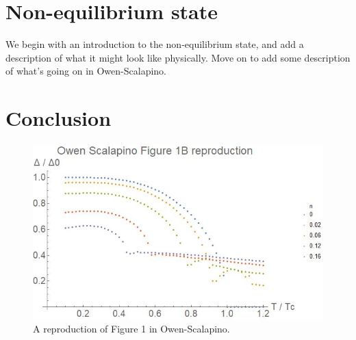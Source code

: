 \documentclass[%
 preprint,
 amsmath,amssymb,
 aps,
]{revtex4-2}
\begin{document}
\section{Non-equilibrium state} \label{sec:nonequilibrium}
We begin with an introduction to the non-equilibrium state, and add a description of what it might look like physically.
Move on to add some description of what's going on in Owen-Scalapino\cite{OwenScalapino}.

\section{Conclusion} \label{sec:conclusion}

\begin{figure}[b]
	\includegraphics[width=\linewidth]{osGapVsTReproduction}
	\caption{\label{fig:osFig1Reproduction} A reproduction of Figure 1 in Owen-Scalapino\cite{OwenScalapino}.}
\end{figure}


\end{document}
